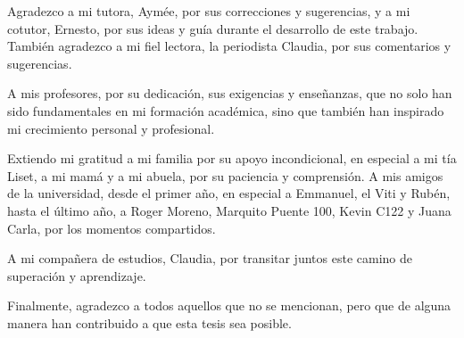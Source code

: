 \begin{acknowledgements}
    Agradezco a mi tutora, Aymée, por sus correcciones y sugerencias, 
    y a mi cotutor, Ernesto, por sus ideas y guía durante el desarrollo 
    de este trabajo. También agradezco a mi fiel lectora, la 
    periodista Claudia, por sus comentarios y sugerencias.

    A mis profesores, por su dedicación, sus exigencias y enseñanzas,
     que no solo han sido fundamentales en mi formación académica, 
     sino que también han inspirado mi crecimiento personal y 
     profesional. 

Extiendo mi gratitud a mi familia por su apoyo incondicional, en 
especial a mi tía Liset, a mi mamá y a mi abuela, por su paciencia y 
comprensión. A mis amigos de la universidad, desde el primer año, 
en especial a Emmanuel, el Viti y Rubén, hasta el último año, a 
Roger Moreno, Marquito Puente 100, Kevin C122 y Juana Carla, 
por los momentos compartidos.

A mi compañera de estudios, Claudia, por transitar juntos este camino 
de superación y aprendizaje. 

Finalmente, agradezco a todos aquellos que 
no se mencionan, pero que de alguna manera han contribuido a que esta 
tesis sea posible.

\end{acknowledgements}